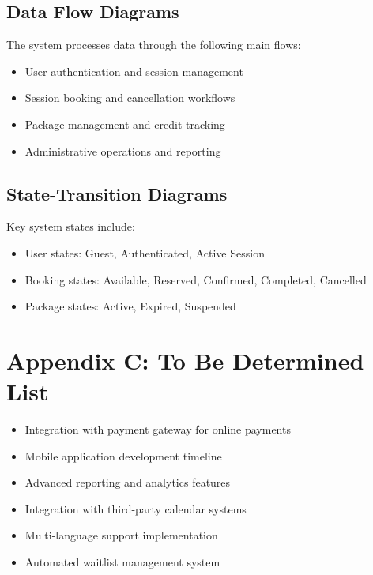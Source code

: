 \documentclass[12pt,a4paper]{article}
\begin{document}
\subsection*{Data Flow Diagrams}
The system processes data through the following main flows:
\begin{itemize}
    \item User authentication and session management
    \item Session booking and cancellation workflows
    \item Package management and credit tracking
    \item Administrative operations and reporting
\end{itemize}

\subsection*{State-Transition Diagrams}
Key system states include:
\begin{itemize}
    \item User states: Guest, Authenticated, Active Session
    \item Booking states: Available, Reserved, Confirmed, Completed, Cancelled
    \item Package states: Active, Expired, Suspended
\end{itemize}

\section*{Appendix C: To Be Determined List}

\begin{itemize}
    \item Integration with payment gateway for online payments
    \item Mobile application development timeline
    \item Advanced reporting and analytics features
    \item Integration with third-party calendar systems
    \item Multi-language support implementation
    \item Automated waitlist management system
\end{itemize}
\end{document}

